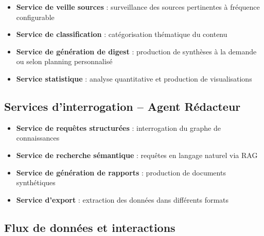 \documentclass[a4paper,11pt]{report}
\providecommand{\tightlist}{\setlength{\itemsep}{0pt}\setlength{\parskip}{0pt}}
\begin{document}
\begin{itemize}
\tightlist
\item
  \textbf{Service de veille sources} : surveillance des sources pertinentes à fréquence configurable
\item
  \textbf{Service de classification} : catégorisation thématique du contenu
\item
  \textbf{Service de génération de digest} : production de synthèses à la demande ou selon planning personnalisé
\item
  \textbf{Service statistique} : analyse quantitative et production de visualisations
\end{itemize}

\subsection{Services d'interrogation -- Agent Rédacteur}\label{services-dinterrogation-agent-ruxe9dacteur}

\begin{itemize}
\tightlist
\item
  \textbf{Service de requêtes structurées} : interrogation du graphe de connaissances
\item
  \textbf{Service de recherche sémantique} : requêtes en langage naturel via RAG
\item
  \textbf{Service de génération de rapports} : production de documents synthétiques
\item
  \textbf{Service d'export} : extraction des données dans différents formats
\end{itemize}

\subsection{Flux de données et interactions}\label{flux-de-donnuxe9es-et-interactions}
\end{document}
